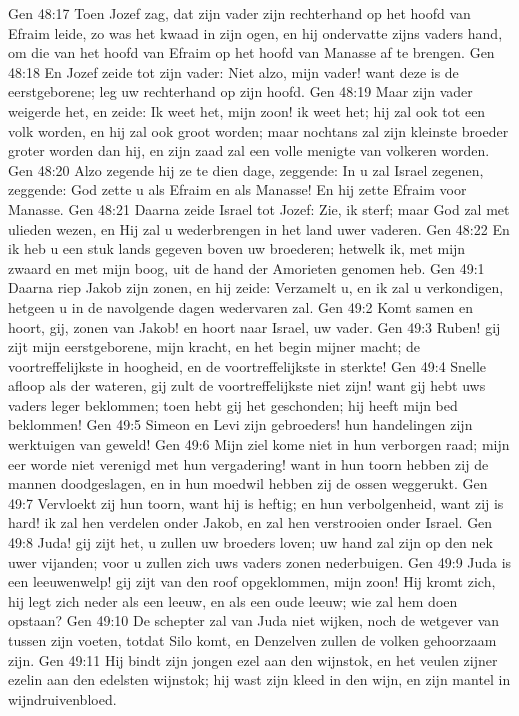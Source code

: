 Gen 48:17  Toen Jozef zag, dat zijn vader zijn rechterhand op het hoofd van Efraim leide, zo was het kwaad in zijn ogen, en hij ondervatte zijns vaders hand, om die van het hoofd van Efraim op het hoofd van Manasse af te brengen.
Gen 48:18  En Jozef zeide tot zijn vader: Niet alzo, mijn vader! want deze is de eerstgeborene; leg uw rechterhand op zijn hoofd.
Gen 48:19  Maar zijn vader weigerde het, en zeide: Ik weet het, mijn zoon! ik weet het; hij zal ook tot een volk worden, en hij zal ook groot worden; maar nochtans zal zijn kleinste broeder groter worden dan hij, en zijn zaad zal een volle menigte van volkeren worden.
Gen 48:20  Alzo zegende hij ze te dien dage, zeggende: In u zal Israel zegenen, zeggende: God zette u als Efraim en als Manasse! En hij zette Efraim voor Manasse.
Gen 48:21  Daarna zeide Israel tot Jozef: Zie, ik sterf; maar God zal met ulieden wezen, en Hij zal u wederbrengen in het land uwer vaderen.
Gen 48:22  En ik heb u een stuk lands gegeven boven uw broederen; hetwelk ik, met mijn zwaard en met mijn boog, uit de hand der Amorieten genomen heb.
Gen 49:1  Daarna riep Jakob zijn zonen, en hij zeide: Verzamelt u, en ik zal u verkondigen, hetgeen u in de navolgende dagen wedervaren zal.
Gen 49:2  Komt samen en hoort, gij, zonen van Jakob! en hoort naar Israel, uw vader.
Gen 49:3  Ruben! gij zijt mijn eerstgeborene, mijn kracht, en het begin mijner macht; de voortreffelijkste in hoogheid, en de voortreffelijkste in sterkte!
Gen 49:4  Snelle afloop als der wateren, gij zult de voortreffelijkste niet zijn! want gij hebt uws vaders leger beklommen; toen hebt gij het geschonden; hij heeft mijn bed beklommen!
Gen 49:5  Simeon en Levi zijn gebroeders! hun handelingen zijn werktuigen van geweld!
Gen 49:6  Mijn ziel kome niet in hun verborgen raad; mijn eer worde niet verenigd met hun vergadering! want in hun toorn hebben zij de mannen doodgeslagen, en in hun moedwil hebben zij de ossen weggerukt.
Gen 49:7  Vervloekt zij hun toorn, want hij is heftig; en hun verbolgenheid, want zij is hard! ik zal hen verdelen onder Jakob, en zal hen verstrooien onder Israel.
Gen 49:8  Juda! gij zijt het, u zullen uw broeders loven; uw hand zal zijn op den nek uwer vijanden; voor u zullen zich uws vaders zonen nederbuigen.
Gen 49:9  Juda is een leeuwenwelp! gij zijt van den roof opgeklommen, mijn zoon! Hij kromt zich, hij legt zich neder als een leeuw, en als een oude leeuw; wie zal hem doen opstaan?
Gen 49:10  De schepter zal van Juda niet wijken, noch de wetgever van tussen zijn voeten, totdat Silo komt, en Denzelven zullen de volken gehoorzaam zijn.
Gen 49:11  Hij bindt zijn jongen ezel aan den wijnstok, en het veulen zijner ezelin aan den edelsten wijnstok; hij wast zijn kleed in den wijn, en zijn mantel in wijndruivenbloed.
